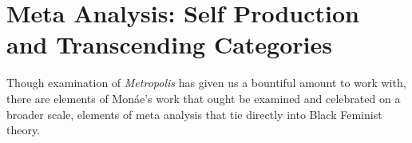\documentclass[a4paper, 11pt]{article} %
\begin{document}



\section*{Meta Analysis: Self Production and Transcending Categories}

Though examination of \emph{Metropolis} has given us a bountiful amount to work with, there are elements of Mon\'ae's work that ought be examined and celebrated on a broader scale, elements of meta analysis that tie directly into Black Feminist theory.
\end{document}
